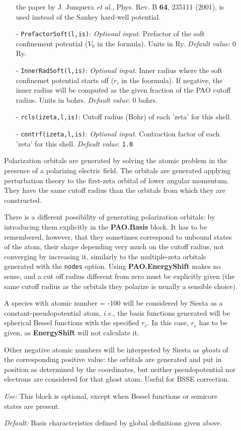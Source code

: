 \documentclass[11pt]{article}
\begin{document}
\begin{description}
\begin{itemize}
the paper by J. Junquera {\it et al.}, Phys. Rev. B {\bf 64}, 235111 (2001),
is used instead of the Sankey hard-well potential.
\item[-] {\tt PrefactorSoft(l,is)}: {\it Optional input}. Prefactor
of the soft confinement potential ($V_{0}$ in the formula). Units in Ry. 
{\it Default value}: 0 Ry.
\item[-] {\tt InnerRadSoft(l,is)}: {\it Optional input}. Inner radius where
the soft confinemet potential starts off ($r_{i}$ in the foormula). 
If negative, the inner radius will be computed as the given fraction
of the PAO cutoff radius.
Units in bohrs. {\it Default value}: 0 bohrs. 
\item[-] {\tt rcls(izeta,l,is)}: Cutoff radius (Bohr) of 
each 'zeta' for this shell.
\item[-] {\tt contrf(izeta,l,is)}: {\it Optional input}. 
Contraction factor of 
each 'zeta' for this shell.
{\it Default value}: {\tt 1.0}
\end{itemize} 

Polarization orbitals are generated by solving the
atomic problem in the presence of a polarizing electric field. The
orbitals are generated applying perturbation theory to the first-zeta
orbital of lower angular momentum.  They have the same cutoff radius
than the orbitals from which they are constructed.

There is a different possibility of generating polarization orbitals:
by introducing them explicitly in the {\bf PAO.Basis} block.
It has to be remembered, however, that they sometimes correspond to 
unbound states of the atom, their shape depending very much on the
cutoff radius, not converging by increasing it, similarly to the
multiple-zeta orbitals generated with the {\tt nodes} option. 
Using {\bf PAO.EnergyShift} makes no sense, and a cut off 
radius different from zero must be explicitly given (the same cutoff radius
as the orbitals they polarize is usually a sensible choice).

A species with atomic number = -100 will be considered by {\sc Siesta} as
a constant-pseudopotential atom, {\it i.e.}, the basis functions
generated will be spherical Bessel functions
with the specified $r_c$. In this case, $r_c$ has to be given, as
{\bf EnergyShift} will not calculate it.

Other negative atomic numbers will be interpreted by {\sc Siesta} as 
{\it ghosts} 
of the corresponding positive value: the orbitals
are generated and put in position as determined by the coordinates,
but neither pseudopotential nor electrons are considered for that
ghost atom. Useful for BSSE correction.

{\it Use:} This block is optional, except when Bessel functions or
semicore states are present. 

{\it Default:} Basis characteristics defined by global definitions given
above.

\end{description}
\end{document}
